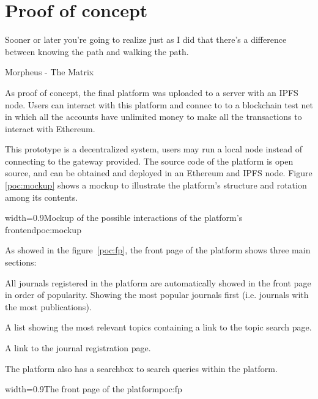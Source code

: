 \chapter{Proof of concept}
\label{poc}
\begin{FraseCelebre}
  \begin{Frase}
    Sooner or later you're going to realize just as I did that there's a
    difference between knowing the path and walking the path.
  \end{Frase}
  \begin{Fuente}
    Morpheus - The Matrix
  \end{Fuente}
\end{FraseCelebre}
As proof of concept, the final platform was uploaded to a server with an IPFS
node. Users can interact with this platform and connec to to a blockchain test
net in which all the accounts have unlimited money to make all the transactions
to interact with Ethereum.

This prototype is a decentralized system, users may run a local node instead of
connecting to the gateway provided. The source code of the platform is open
source, and can be obtained and deployed in an Ethereum and IPFS node. Figure
\ref{poc:mockup} shows a mockup to illustrate the platform's structure and
rotation among its contents.

 {width=0.9\linewidth}{Mockup of the possible
  interactions of the platform's frontend}{poc:mockup}



As showed in the figure~\ref{poc:fp}, the front page of the platform shows three
main sections:

\begin{itemize}
   All journals registered in
  the platform are automatically showed in the front page in order of
  popularity. Showing the most popular journals first (i.e. journals with the
  most publications).

   A list showing the most relevant topics containing a
  link to the topic search page.

   A link to the journal registration page.

\end{itemize}

The platform also has a searchbox to search queries within the platform.

 {width=0.9\linewidth}{The front page of the
  platform}{poc:fp}

